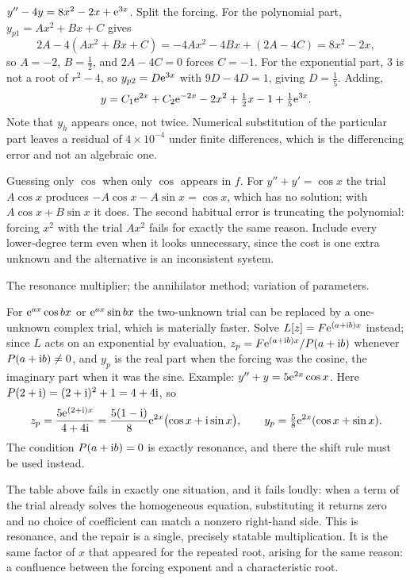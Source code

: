 \begin{worked}
$y''-4y=8x^{2}-2x+\mathrm{e}^{3x}$. Split the forcing. For the polynomial part, $y_{p1}=Ax^{2}+Bx+C$ gives
\[2A-4(Ax^{2}+Bx+C)=-4Ax^{2}-4Bx+(2A-4C)=8x^{2}-2x,\]
so $A=-2$, $B=\tfrac12$, and $2A-4C=0$ forces $C=-1$. For the exponential part, $3$ is not a root of $r^{2}-4$, so $y_{p2}=D\mathrm{e}^{3x}$ with $9D-4D=1$, giving $D=\tfrac15$. Adding,
\[y=C_1\mathrm{e}^{2x}+C_2\mathrm{e}^{-2x}-2x^{2}+\tfrac12x-1+\tfrac15\mathrm{e}^{3x}.\]
Note that $y_h$ appears once, not twice. Numerical substitution of the particular part leaves a residual of $4\times10^{-4}$ under finite differences, which is the differencing error and not an algebraic one.
\end{worked}

\begin{trap}
Guessing only $\cos$ when only $\cos$ appears in $f$. For $y''+y'=\cos x$ the trial $A\cos x$ produces $-A\cos x-A\sin x=\cos x$, which has no solution; with $A\cos x+B\sin x$ it does. The second habitual error is truncating the polynomial: forcing $x^{2}$ with the trial $Ax^{2}$ fails for exactly the same reason. Include every lower-degree term even when it looks unnecessary, since the cost is one extra unknown and the alternative is an inconsistent system.
\end{trap}

\begin{seealsob}The resonance multiplier; the annihilator method; variation of parameters.\end{seealsob}

\begin{keynote}
For $\mathrm{e}^{ax}\cos bx$ or $\mathrm{e}^{ax}\sin bx$ the two-unknown trial can be replaced by a one-unknown complex trial, which is materially faster. Solve $L[z]=F\mathrm{e}^{(a+\mathrm{i} b)x}$ instead; since $L$ acts on an exponential by evaluation, $z_p=F\mathrm{e}^{(a+\mathrm{i} b)x}/P(a+\mathrm{i} b)$ whenever $P(a+\mathrm{i} b)\ne0$, and $y_p$ is the real part when the forcing was the cosine, the imaginary part when it was the sine. Example: $y''+y=5\mathrm{e}^{2x}\cos x$. Here $P(2+\mathrm{i})=(2+\mathrm{i})^{2}+1=4+4\mathrm{i}$, so
\[z_p=\frac{5\mathrm{e}^{(2+\mathrm{i})x}}{4+4\mathrm{i}}=\frac{5(1-\mathrm{i})}{8}\mathrm{e}^{2x}\bigl(\cos x+\mathrm{i}\sin x\bigr),\qquad y_p=\tfrac58\mathrm{e}^{2x}(\cos x+\sin x).\]
The condition $P(a+\mathrm{i} b)=0$ is exactly resonance, and there the shift rule must be used instead.
\end{keynote}

The table above fails in exactly one situation, and it fails loudly: when a term of the trial already solves the homogeneous equation, substituting it returns zero and no choice of coefficient can match a nonzero right-hand side. This is resonance, and the repair is a single, precisely statable multiplication. It is the same factor of $x$ that appeared for the repeated root, arising for the same reason: a confluence between the forcing exponent and a characteristic root.

